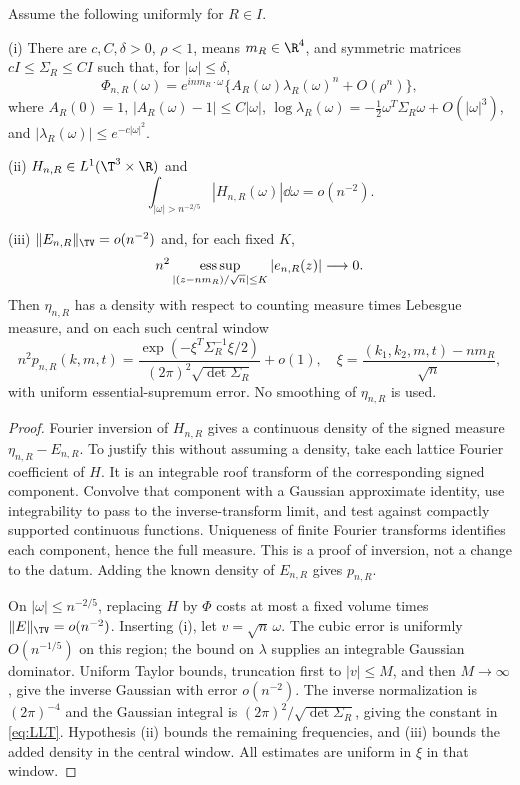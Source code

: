 \begin{theorem}\label{thm:LLT}
Assume the following uniformly for $R\in I$.

\smallskip\noindent
(i) There are $c,C,\delta>0$, $\rho<1$, means $m_R\in\R^4$, and symmetric matrices $cI\le\Sigma_R\le CI$ such that, for $|\omega|\le\delta$,
\[
 \Phi_{n,R}(\omega)=e^{inm_R\cdot\omega}
 \{A_R(\omega)\lambda_R(\omega)^n+O(\rho^n)\},
\]
where $A_R(0)=1$, $|A_R(\omega)-1|\le C|\omega|$,
$\log\lambda_R(\omega)=-\tfrac12\omega^T\Sigma_R\omega+O(|\omega|^3)$, and $|\lambda_R(\omega)|\le e^{-c|\omega|^2}$.

\smallskip\noindent
(ii) $H_{n,R}\in L^1(\T^3\times\R)$ and
\begin{equation}\label{eq:tailcriterion}
 \int_{|\omega|>n^{-2/5}}|H_{n,R}(\omega)|\dd\omega=o(n^{-2}).
\end{equation}

\smallskip\noindent
(iii) $\|E_{n,R}\|_{\TV}=o(n^{-2})$ and, for each fixed $K$,
\[
 n^2\mathop{\rm ess\,sup}_{|(z-nm_R)/\sqrt n|\le K}|e_{n,R}(z)|\longrightarrow0.
\]
Then $\eta_{n,R}$ has a density with respect to counting measure times Lebesgue measure, and on each such central window
\begin{equation}\label{eq:LLT}
 n^2 p_{n,R}(k,m,t)=
 \frac{\exp(-\xi^T\Sigma_R^{-1}\xi/2)}{(2\pi)^2\sqrt{\det\Sigma_R}}+o(1),
 \quad \xi=\frac{(k_1,k_2,m,t)-nm_R}{\sqrt n},
\end{equation}
with uniform essential-supremum error. No smoothing of $\eta_{n,R}$ is used.
\end{theorem}
\begin{proof}
Fourier inversion of $H_{n,R}$ gives a continuous density of the signed measure $\eta_{n,R}-E_{n,R}$. To justify this without assuming a density, take each lattice Fourier coefficient of $H$. It is an integrable roof transform of the corresponding signed component. Convolve that component with a Gaussian approximate identity, use integrability to pass to the inverse-transform limit, and test against compactly supported continuous functions. Uniqueness of finite Fourier transforms identifies each component, hence the full measure. This is a proof of inversion, not a change to the datum. Adding the known density of $E_{n,R}$ gives $p_{n,R}$.

On $|\omega|\le n^{-2/5}$, replacing $H$ by $\Phi$ costs at most a fixed volume times $\|E\|_{\TV}=o(n^{-2})$. Inserting (i), let $v=\sqrt n\,\omega$. The cubic error is uniformly $O(n^{-1/5})$ on this region; the bound on $\lambda$ supplies an integrable Gaussian dominator. Uniform Taylor bounds, truncation first to $|v|\le M$, and then $M\to\infty$, give the inverse Gaussian with error $o(n^{-2})$. The inverse normalization is $(2\pi)^{-4}$ and the Gaussian integral is $(2\pi)^2/\sqrt{\det\Sigma_R}$, giving the constant in \eqref{eq:LLT}. Hypothesis (ii) bounds the remaining frequencies, and (iii) bounds the added density in the central window. All estimates are uniform in $\xi$ in that window.
\end{proof}

